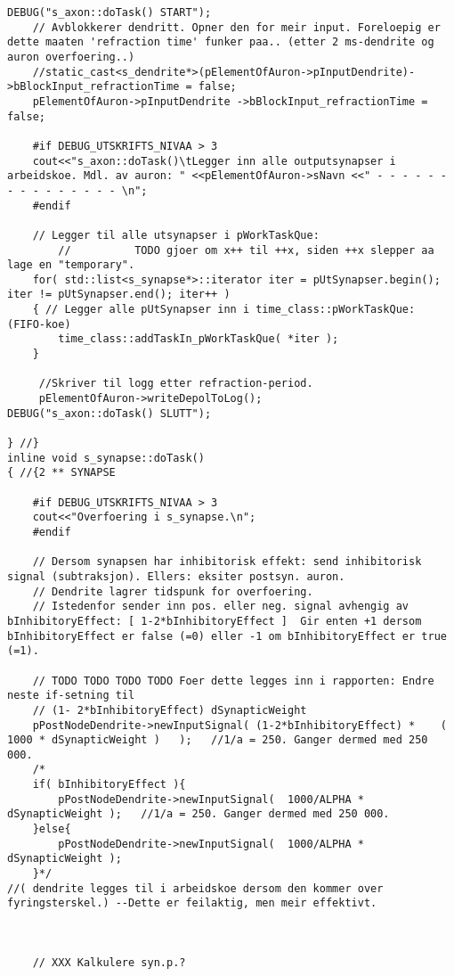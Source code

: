 \begin{lstlisting}
DEBUG("s_axon::doTask() START");
	// Avblokkerer dendritt. Opner den for meir input. Foreloepig er dette maaten 'refraction time' funker paa.. (etter 2 ms-dendrite og auron overfoering..)
	//static_cast<s_dendrite*>(pElementOfAuron->pInputDendrite)->bBlockInput_refractionTime = false;
	pElementOfAuron->pInputDendrite ->bBlockInput_refractionTime = false;

	#if DEBUG_UTSKRIFTS_NIVAA > 3
 	cout<<"s_axon::doTask()\tLegger inn alle outputsynapser i arbeidskoe. Mdl. av auron: " <<pElementOfAuron->sNavn <<" - - - - - - - - - - - - - - - \n";
	#endif

	// Legger til alle utsynapser i pWorkTaskQue:
		//			TODO gjoer om x++ til ++x, siden ++x slepper aa lage en "temporary".
 	for( std::list<s_synapse*>::iterator iter = pUtSynapser.begin(); iter != pUtSynapser.end(); iter++ )
	{ // Legger alle pUtSynapser inn i time_class::pWorkTaskQue: (FIFO-koe)
		time_class::addTaskIn_pWorkTaskQue( *iter );
	}

	 //Skriver til logg etter refraction-period.
	 pElementOfAuron->writeDepolToLog();
DEBUG("s_axon::doTask() SLUTT");

} //}
inline void s_synapse::doTask()
{ //{2 ** SYNAPSE

	#if DEBUG_UTSKRIFTS_NIVAA > 3
	cout<<"Overfoering i s_synapse.\n";
	#endif

	// Dersom synapsen har inhibitorisk effekt: send inhibitorisk signal (subtraksjon). Ellers: eksiter postsyn. auron.
	// Dendrite lagrer tidspunk for overfoering.
	// Istedenfor sender inn pos. eller neg. signal avhengig av bInhibitoryEffect: [ 1-2*bInhibitoryEffect ]  Gir enten +1 dersom bInhibitoryEffect er false (=0) eller -1 om bInhibitoryEffect er true (=1).

	// TODO TODO TODO TODO Foer dette legges inn i rapporten: Endre neste if-setning til
	// (1- 2*bInhibitoryEffect) dSynapticWeight 
 	pPostNodeDendrite->newInputSignal( (1-2*bInhibitoryEffect) * 	( 1000 * dSynapticWeight )   );   //1/a = 250. Ganger dermed med 250 000.
	/*
	if( bInhibitoryEffect ){
 		pPostNodeDendrite->newInputSignal(  1000/ALPHA * dSynapticWeight );   //1/a = 250. Ganger dermed med 250 000.
	}else{
		pPostNodeDendrite->newInputSignal(  1000/ALPHA * dSynapticWeight );
	}*/
//( dendrite legges til i arbeidskoe dersom den kommer over fyringsterskel.) --Dette er feilaktig, men meir effektivt.
		


	// XXX Kalkulere syn.p.?




\end{lstlisting}
